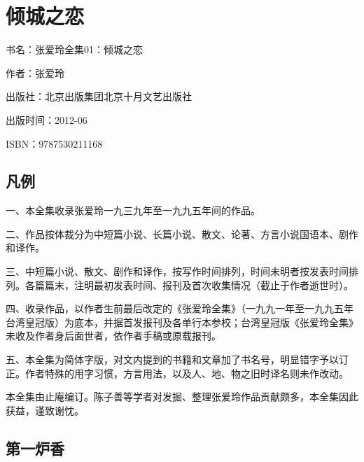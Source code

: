
\section{倾城之恋}

\par 书名：张爱玲全集01：倾城之恋
\par 作者：张爱玲
\par 出版社：北京出版集团北京十月文艺出版社
\par 出版时间：2012-06
\par ISBN：9787530211168


\subsection{凡例}

\par 一、本全集收录张爱玲一九三九年至一九九五年间的作品。
\par 二、作品按体裁分为中短篇小说、长篇小说、散文、论著、方言小说国语本、剧作和译作。
\par 三、中短篇小说、散文、剧作和译作，按写作时间排列，时间未明者按发表时间排列。各篇篇末，注明最初发表时间、报刊及首次收集情况（截止于作者逝世时）。
\par 四、收录作品，以作者生前最后改定的《张爱玲全集》（一九九一年至一九九五年台湾皇冠版）为底本，并据首发报刊及各单行本参校；台湾皇冠版《张爱玲全集》未收及作者身后面世者，依作者手稿或原载报刊。
\par 五、本全集为简体字版，对文内提到的书籍和文章加了书名号，明显错字予以订正。作者特殊的用字习惯，方言用法，以及人、地、物之旧时译名则未作改动。
\par 本全集由止庵编订。陈子善等学者对发掘、整理张爱玲作品贡献颇多，本全集因此获益，谨致谢忱。


\subsection{第一炉香}

